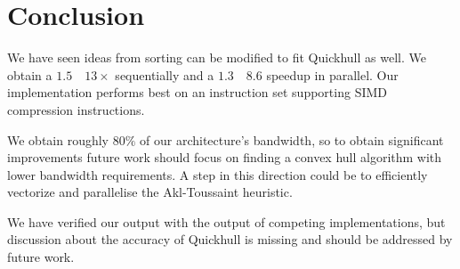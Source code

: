 \section{Conclusion}

We have seen ideas from sorting can be modified to fit Quickhull as well.
We obtain a $1.5$~\textendash~$13\times$ sequentially and a 
$1.3$~\textendash~$8.6$ speedup in parallel. Our implementation performs best
on an instruction set supporting SIMD compression instructions.

We obtain roughly $80\%$ of our architecture's bandwidth, so to obtain 
significant improvements future work should focus on finding a convex hull
algorithm with lower bandwidth requirements. A step in this direction could
be to efficiently vectorize and parallelise the Akl-Toussaint heuristic.

We have verified our output with the output of competing implementations, but
discussion about the accuracy of Quickhull is missing and should be addressed
by future work.
